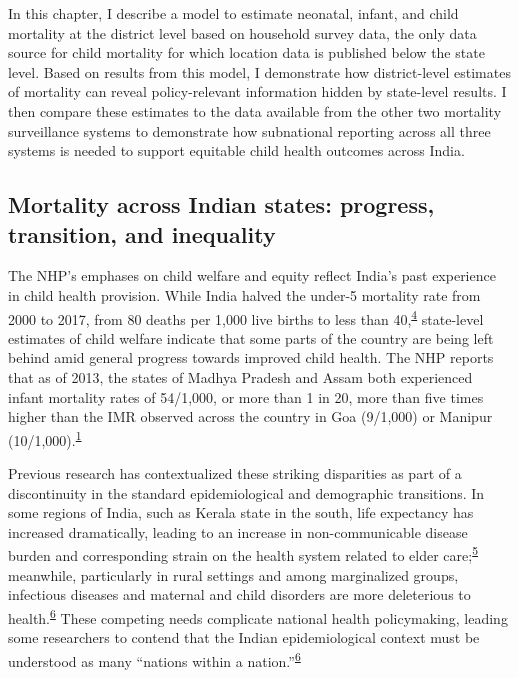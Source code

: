 \documentclass[
]{article}
\begin{document}
In this chapter, I describe a model to estimate neonatal, infant, and child mortality at the district level based on household survey data, the only data source for child mortality for which location data is published below the state level. Based on results from this model, I demonstrate how district-level estimates of mortality can reveal policy-relevant information hidden by state-level results. I then compare these estimates to the data available from the other two mortality surveillance systems to demonstrate how subnational reporting across all three systems is needed to support equitable child health outcomes across India.

\hypertarget{mortality-across-indian-states-progress-transition-and-inequality}{%
\subsection{Mortality across Indian states: progress, transition, and inequality}\label{mortality-across-indian-states-progress-transition-and-inequality}}

The NHP's emphases on child welfare and equity reflect India's past experience in child health provision. While India halved the under-5 mortality rate from 2000 to 2017, from 80 deaths per 1,000 live births to less than 40,\textsuperscript{\protect\hyperlink{ref-Dicker2018}{4}} state-level estimates of child welfare indicate that some parts of the country are being left behind amid general progress towards improved child health. The NHP reports that as of 2013, the states of Madhya Pradesh and Assam both experienced infant mortality rates of 54/1,000, or more than 1 in 20, more than five times higher than the IMR observed across the country in Goa (9/1,000) or Manipur (10/1,000).\textsuperscript{\protect\hyperlink{ref-IND_MOHFW2017}{1}}

Previous research has contextualized these striking disparities as part of a discontinuity in the standard epidemiological and demographic transitions. In some regions of India, such as Kerala state in the south, life expectancy has increased dramatically, leading to an increase in non-communicable disease burden and corresponding strain on the health system related to elder care;\textsuperscript{\protect\hyperlink{ref-Yadav2014}{5}} meanwhile, particularly in rural settings and among marginalized groups, infectious diseases and maternal and child disorders are more deleterious to health.\textsuperscript{\protect\hyperlink{ref-Dandona2017}{6}} These competing needs complicate national health policymaking, leading some researchers to contend that the Indian epidemiological context must be understood as many ``nations within a nation.''\textsuperscript{\protect\hyperlink{ref-Dandona2017}{6}}
\end{document}
